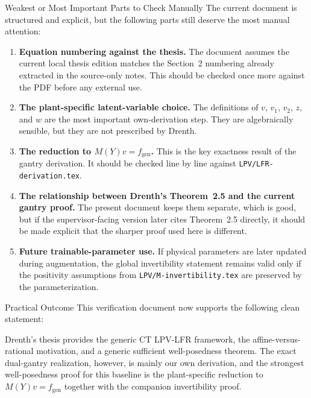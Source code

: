 ﻿\documentclass[11pt]{article}
\begin{document}
\begin{warningbox}{Weakest or Most Important Parts to Check Manually}
The current document is structured and explicit, but the following parts still
deserve the most manual attention:
\begin{enumerate}[leftmargin=1.4em,label=\arabic*.]
    \item \textbf{Equation numbering against the thesis.} The document assumes
    the current local thesis edition matches the Section~2 numbering already
    extracted in the source-only notes. This should be checked once more against
    the PDF before any external use.
    \item \textbf{The plant-specific latent-variable choice.} The definitions of
    $v$, $v_1$, $v_2$, $z$, and $w$ are the most important own-derivation step.
    They are algebraically sensible, but they are not prescribed by Drenth.
    \item \textbf{The reduction to $M(Y)v = f_{\mathrm{gen}}$.} This is the key
    exactness result of the gantry derivation. It should be checked line by line
    against \texttt{LPV/LFR-derivation.tex}.
    \item \textbf{The relationship between Drenth's Theorem~2.5 and the current
    gantry proof.} The present document keeps them separate, which is good, but
    if the supervisor-facing version later cites Theorem~2.5 directly, it should
    be made explicit that the sharper proof used here is different.
    \item \textbf{Future trainable-parameter use.} If physical parameters are
    later updated during augmentation, the global invertibility statement remains
    valid only if the positivity assumptions from \texttt{LPV/M-invertibility.tex}
    are preserved by the parameterization.
\end{enumerate}
\end{warningbox}

\begin{resultbox}{Practical Outcome}
This verification document now supports the following clean statement:

Drenth's thesis provides the generic CT LPV-LFR framework, the affine-versus-rational
motivation, and a generic sufficient well-posedness theorem. The exact
dual-gantry realization, however, is mainly our own derivation, and the
strongest well-posedness proof for this baseline is the plant-specific reduction
to $M(Y)v = f_{\mathrm{gen}}$ together with the companion invertibility proof.
\end{resultbox}
\end{document}
